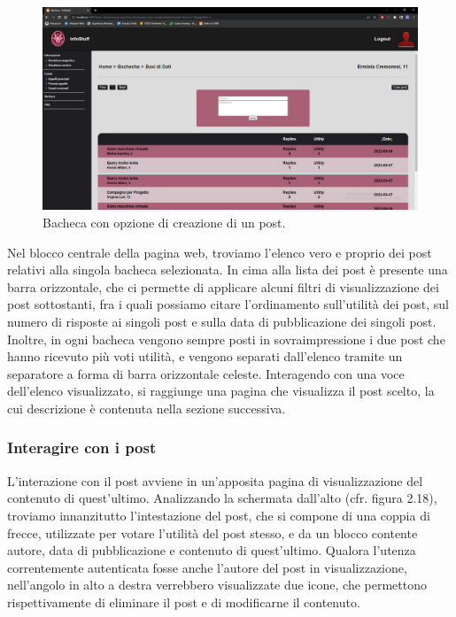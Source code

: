 \documentclass [a4paper,11pt]{book}
\begin{document}
\begin{figure}
\centering
\includegraphics[scale=0.3]{figura2-17.png}
\caption{Bacheca con opzione di creazione di un post.}
\end{figure}

Nel blocco centrale della pagina web, troviamo l'elenco vero e proprio dei post relativi alla singola bacheca selezionata. In cima alla lista dei post è presente una barra orizzontale, che ci permette di applicare alcuni filtri di visualizzazione dei post sottostanti, fra i quali possiamo citare l'ordinamento sull'utilità dei post, sul numero di risposte ai singoli post e sulla data di pubblicazione dei singoli post. Inoltre, in ogni bacheca vengono sempre posti in sovraimpressione i due post che hanno ricevuto più voti utilità, e vengono separati dall'elenco tramite un separatore a forma di barra orizzontale celeste. Interagendo con una voce dell'elenco visualizzato, si raggiunge una pagina che visualizza il post scelto, la cui descrizione è contenuta nella sezione successiva.

\medskip

\subsubsection{Interagire con i post}

L'interazione con il post avviene in un'apposita pagina di visualizzazione del contenuto di quest'ultimo. Analizzando la schermata dall'alto (cfr. figura 2.18), troviamo innanzitutto l'intestazione del post, che si compone di una coppia di frecce, utilizzate per votare l'utilità del post stesso, e da un blocco contente autore, data di pubblicazione e contenuto di quest'ultimo. Qualora l'utenza correntemente autenticata fosse anche l'autore del post in visualizzazione, nell'angolo in alto a destra verrebbero visualizzate due icone, che permettono rispettivamente di eliminare il post e di modificarne il contenuto.
\end{document}
